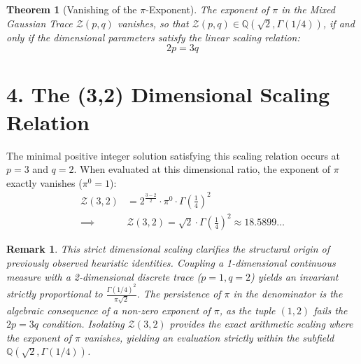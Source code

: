 \documentclass[12pt]{article}
\newtheorem{theorem}{Theorem}
\newtheorem{remark}{Remark}
\begin{document}
\begin{theorem}[Vanishing of the $\pi$-Exponent]
The exponent of $\pi$ in the Mixed Gaussian Trace $\mathcal{Z}(p,q)$ vanishes, so that $\mathcal{Z}(p,q) \in \mathbb{Q}(\sqrt{2}, \Gamma(1/4))$, if and only if the dimensional parameters satisfy the linear scaling relation:
\begin{equation}
    2p = 3q
\end{equation}
\end{theorem}

\section*{4. The (3,2) Dimensional Scaling Relation}
The minimal positive integer solution satisfying this scaling relation occurs at $p=3$ and $q=2$. When evaluated at this dimensional ratio, the exponent of $\pi$ exactly vanishes ($\pi^0 = 1$):
\begin{align}
    \mathcal{Z}(3, 2) &= 2^{\frac{3-2}{2}} \cdot \pi^0 \cdot \Gamma\left(\frac{1}{4}\right)^2 \nonumber \\
    \implies \quad &\boxed{ \mathcal{Z}(3, 2) = \sqrt{2} \cdot \Gamma\left(\frac{1}{4}\right)^2 \approx 18.5899\dots }
\end{align}

\begin{remark}
This strict dimensional scaling clarifies the structural origin of previously observed heuristic identities. Coupling a 1-dimensional continuous measure with a 2-dimensional discrete trace ($p=1, q=2$) yields an invariant strictly proportional to $\frac{\Gamma(1/4)^2}{\pi\sqrt{2}}$. The persistence of $\pi$ in the denominator is the algebraic consequence of a non-zero exponent of $\pi$, as the tuple $(1,2)$ fails the $2p=3q$ condition. Isolating $\mathcal{Z}(3,2)$ provides the exact arithmetic scaling where the exponent of $\pi$ vanishes, yielding an evaluation strictly within the subfield $\mathbb{Q}(\sqrt{2}, \Gamma(1/4))$.
\end{remark}
\end{document}
